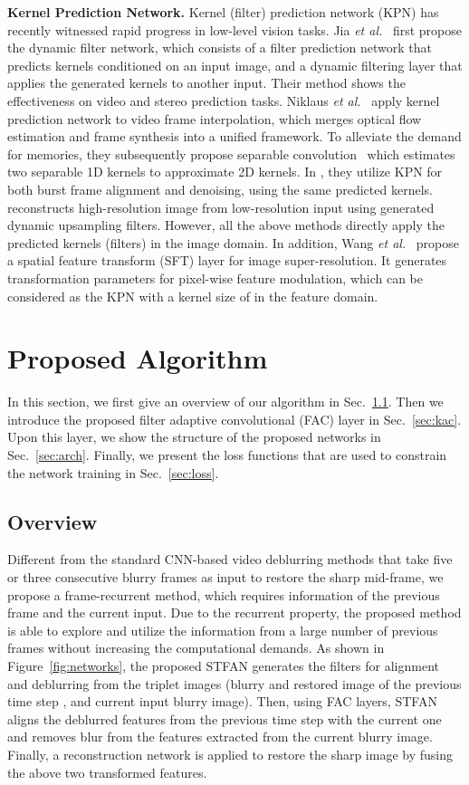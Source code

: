 \documentclass[10pt,twocolumn,letterpaper]{article}
\begin{document}
\noindent \textbf{Kernel Prediction Network.}
Kernel (filter) prediction network (KPN) has recently witnessed rapid progress in low-level vision tasks.
Jia \textit{et al.}~\cite{jia2016dynamic} first propose the dynamic filter network, which consists of a filter prediction network that predicts kernels conditioned on an input image,
and a dynamic filtering layer that applies the generated kernels to another input.
Their method shows the effectiveness on video and stereo prediction tasks.
Niklaus \textit{et al.}~\cite{niklaus2017video} apply kernel prediction network to video frame interpolation, which merges optical flow estimation and frame synthesis into a unified framework.
To alleviate the demand for memories, they subsequently propose separable convolution~\cite{niklaus2017sep} which estimates two separable 1D kernels to approximate 2D kernels.
In \cite{mildenhall2018burst}, they utilize KPN for both burst frame alignment  and denoising, using the same predicted kernels.
\cite{jo2018deep} reconstructs high-resolution image from low-resolution input using generated dynamic upsampling filters.
However, all the above methods directly apply the predicted kernels (filters) in the image domain.
In addition, Wang \textit{et al.}~\cite{wang2018recovering} propose a spatial feature transform (SFT) layer for image super-resolution.
It generates transformation parameters for pixel-wise feature modulation, which can be considered as the KPN with a kernel size of  in the feature domain.
\section{Proposed Algorithm}
In this section, we first give an overview of our algorithm in Sec.~\ref{sec:overview}.
Then we introduce the proposed filter adaptive convolutional (FAC) layer in Sec.~\ref{sec:kac}.
Upon this layer, we show the structure of the proposed networks in Sec.~\ref{sec:arch}.
Finally, we present the loss functions that are used to constrain the network training in Sec.~\ref{sec:loss}.
\subsection{Overview}\label{sec:overview} 
Different from the standard CNN-based video deblurring methods \cite{su2017deep, hyun2017online, kim2018spatio} that take five or three consecutive blurry frames as input to restore the sharp mid-frame,
we propose a frame-recurrent method, which requires information of the previous frame and the current input.
Due to the recurrent property, the proposed method is able to explore and utilize the information from a large number of previous frames without increasing the computational demands.
As shown in Figure~\ref{fig:networks}, the proposed STFAN generates the filters for alignment and deblurring from the triplet images (blurry and restored image of the previous time step , and current input blurry image).
Then, using FAC layers, STFAN aligns the deblurred features from the previous time step with the current one and removes blur from the features  extracted from the current blurry image.
Finally, a reconstruction network is applied to restore the sharp image by fusing the above two transformed features.
\end{document}
